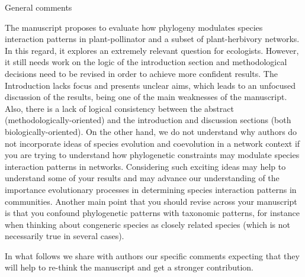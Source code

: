 \documentclass[12pt]{letter}
\newenvironment{refquote}{\bigskip \begin{it}}{\end{it}\smallskip}
\providecommand{\DIFdelbegin}{} %
\providecommand{\DIFdelend}{} %
\newcommand{\DIFscaledelfig}{0.5}
\newlength{\DIFdelgraphicswidth} %
\newlength{\DIFdelgraphicsheight} %
\newcommand{\DIFdelincludegraphics}[2][]{%
\sbox{\DIFdelgraphicsbox}{\DIFOincludegraphics[#1]{#2}}%
\settoboxwidth{\DIFdelgraphicswidth}{\DIFdelgraphicsbox} %
\settoboxtotalheight{\DIFdelgraphicsheight}{\DIFdelgraphicsbox} %
\scalebox{\DIFscaledelfig}{%
\parbox[b]{\DIFdelgraphicswidth}{\usebox{\DIFdelgraphicsbox}\\[-\baselineskip] \rule{\DIFdelgraphicswidth}{0em}}\llap{\resizebox{\DIFdelgraphicswidth}{\DIFdelgraphicsheight}{%
\setlength{\unitlength}{\DIFdelgraphicswidth}%
\begin{picture}(1,1)%
\thicklines\linethickness{2pt} %
{\color[rgb]{1,0,0}\put(0,0){\framebox(1,1){}}}%
{\color[rgb]{1,0,0}\put(0,0){\line( 1,1){1}}}%
{\color[rgb]{1,0,0}\put(0,1){\line(1,-1){1}}}%
\end{picture}%
}\hspace*{3pt}}} %
} %
\DeclareRobustCommand{\DIFdelbegin}{\DIFOdelbegin \let\includegraphics\DIFdelincludegraphics} %
\DeclareRobustCommand{\DIFdelend}{\DIFOaddend \let\includegraphics\DIFOincludegraphics} %
\begin{document}
	\begin{refquote}
	General comments
\DIFdelbegin %
\DIFdelend 

	The manuscript proposes to evaluate how phylogeny modulates species interaction patterns in plant-pollinator and a subset of plant-herbivory networks. In this regard, it explores an extremely relevant question for ecologists. However, it still needs work on the logic of the introduction section and methodological decisions need to be revised in order to achieve more confident results. The Introduction lacks focus and presents unclear aims, which leads to an unfocused discussion of the results, being one of the main weaknesses of the manuscript. Also, there is a lack of logical consistency between the abstract (methodologically-oriented) and the introduction and discussion sections (both biologically-oriented). On the other hand, we do not understand why authors do not incorporate ideas of species evolution and coevolution in a network context if you are trying to understand how phylogenetic constraints may modulate species interaction patterns in networks. Considering such exciting ideas may help to understand some of your results and may advance our understanding of  the importance evolutionary processes in determining species interaction patterns in communities.
	Another main point that you should revise across your manuscript is that you confound phylogenetic patterns with taxonomic patterns, for instance when thinking about congeneric species as closely related species (which is not necessarily true in several cases).

	\smallskip

	In what follows we share with authors our specific comments expecting that they will help to re-think the manuscript and get a stronger contribution.

	\end{refquote}
\end{document}
